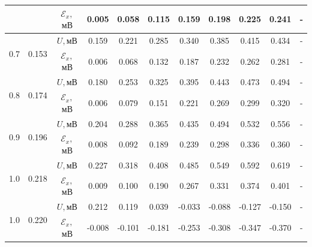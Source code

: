 \documentclass[a4paper, 12pt, twoside]{article}
\begin{document}
\begin{table}[H]
\begin{tabular}{c|c|c|c|c|c|c|c|c|c|c}
		&                                    & $\mathcal{E}_x,$ $ \text{мВ}$& 0.005 & 0.058 & 0.115 & 0.159 & 0.198 & 0.225 & 0.241 & - \\ \midrule
		\multirow{2}{*}{0.7}             & \multirow{2}{*}{0.153}             & $U, \text{мВ}$                                                        & 0.159  & 0.221 & 0.285 & 0.340 & 0.385 & 0.415 & 0.434 & - \\%
		&                                    & $\mathcal{E}_x,$   $\text{мВ}$ & 0.006 & 0.068 & 0.132 & 0.187 & 0.232 & 0.262 & 0.281 & - \\ \midrule
		\multirow{2}{*}{0.8}             & \multirow{2}{*}{0.174}             & $U, \text{мВ}$                                                         & 0.180  & 0.253 & 0.325 & 0.395 & 0.443 & 0.473 & 0.494 & - \\%
		&                                    & $\mathcal{E}_x,$  $ \text{мВ}$ & 0.006 & 0.079 & 0.151 & 0.221 & 0.269 & 0.299 & 0.320 & - \\ \midrule
		\multirow{2}{*}{0.9}             & \multirow{2}{*}{0.196}             & $U, \text{мВ}$                                                          & 0.204  & 0.288 & 0.365 & 0.435 & 0.494 & 0.532 & 0.556 & - \\%
		&                                    & $\mathcal{E}_x,$  $\text{мВ}$& 0.008 & 0.092 & 0.189 & 0.239 & 0.298 & 0.336 & 0.360 & - \\ \midrule
		\multirow{2}{*}{1.0}               & \multirow{2}{*}{0.218}             & $U, \text{мВ}$                                                        & 0.227  & 0.318 & 0.408 & 0.485 & 0.549 & 0.592 & 0.619 & - \\%
		&                                    & $\mathcal{E}_x,$  $\text{мВ}$ & 0.009 & 0.100 & 0.190 & 0.267 & 0.331 & 0.374 & 0.401 & - \\ \midrule
		\multirow{2}{*}{1.0}               & \multirow{2}{*}{0.220}              & $U, \text{мВ}$                                                         & 0.212  & 0.119  & 0.039  & -0.033  & -0.088  & -0.127  & -0.150  & -  \\%
		&                                    & $\mathcal{E}_x,$ $ \text{мВ}$ & -0.008  & -0.101  & -0.181  & -0.253  & -0.308  & -0.347  & -0.370  & -  \\ \bottomrule[0.65mm]
	\end{tabular}
\end{table}
\end{document}
